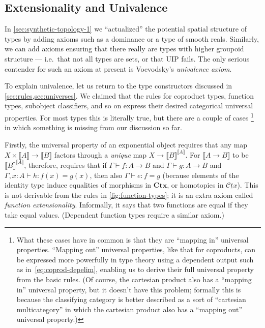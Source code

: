 \documentclass[12pt]{article}
\def\m#1{\llbracket#1\rrbracket}
\def\types{\vdash}
\def\Ctx{\mathbf{Ctx}}
\def\cCtx{\underline{\mathscr{C}\!\mathit{tx}}}
\numberwithin{equation}{section}
\begin{document}
\subsection{Extensionality and Univalence}
\label{sec:voev-univ-axiom}

In \cref{sec:synthetic-topology-1} we ``actualized'' the potential spatial structure of types by adding axioms such as a dominance or a type of smooth reals.
Similarly, we can add axioms ensuring that there really are types with higher groupoid structure --- i.e.\ that not all types are sets, or that UIP fails.
The only serious contender for such an axiom at present is Voevodsky's \emph{univalence axiom}. %

To explain univalence, let us return to the type constructors discussed in \cref{sec:rules,sec:universes}.
We claimed that the rules for coproduct types, function types, subobject classifiers, and so on express their desired categorical universal properties.
For most types this is literally true, but there are a couple of cases%
\footnote{What these cases have in common is that they are ``mapping in'' universal properties.
  ``Mapping out'' universal properties, like that for coproducts, can be expressed more powerfully in type theory using a dependent output such as in~\eqref{eq:coprod-depelim}, enabling us to derive their full universal property from the basic rules.
  (Of course, the cartesian product also has a ``mapping in'' universal property, but it doesn't have this problem; formally this is because the classifying category is better described as a sort of ``cartesian multicategory'' in which the cartesian product also has a ``mapping out'' universal property.)}
in which something is missing from our discussion so far.

Firstly, the universal property of an exponential object requires that any map $X\times \m A \to \m B$ factors through a \emph{unique} map $X\to {\m B}^{\m A}$.
For $\m{A\to B}$ to be ${\m B}^{\m A}$, therefore, requires that if $\Gamma\types f:A\to B$ and $\Gamma\types g:A\to B$ and $\Gamma,x:A \types h: f(x)=g(x)$, then also $\Gamma \types e:f=g$ (because elements of the identity type induce equalities of morphisms in $\Ctx$, or homotopies in $\cCtx$).
This is not derivable from the rules in \cref{fig:function-types}; it is an extra axiom called \emph{function extensionality}.
Informally, it says that two functions are equal if they take equal values.
(Dependent function types %
require a similar axiom.)
\end{document}
